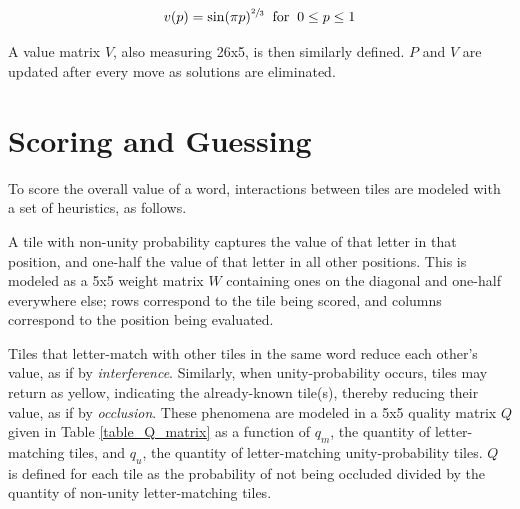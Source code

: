\documentclass[twocolumn]{tudelft-aiaa}
\begin{document}
\begin{equation}
\label{equation_p_vs_v}
v(p) = \sin (\pi p) ^ {\sfrac{2}{3}} \hspace{2mm} \text{for} \hspace{2mm} 0 \leq p \leq 1
\end{equation}

A value matrix $V$, also measuring 26x5, is then similarly defined. $P$ and $V$ are updated after every move as solutions are eliminated.

\section{Scoring and Guessing}

To score the overall value of a word, interactions between tiles are modeled with a set of heuristics, as follows.

A tile with non-unity probability captures the value of that letter in that position, and one-half the value of that letter in all other positions. This is modeled as a 5x5 weight matrix $W$ containing ones on the diagonal and one-half everywhere else; rows correspond to the tile being scored, and columns correspond to the position being evaluated.

Tiles that letter-match with other tiles in the same word reduce each other's value, as if by \emph{interference}. Similarly, when unity-probability occurs, tiles may return as yellow, indicating the already-known tile(s), thereby reducing their value, as if by \emph{occlusion}. These phenomena are modeled in a 5x5 quality matrix $Q$ given in Table \ref{table_Q_matrix} as a function of $q_m$, the quantity of letter-matching tiles, and $q_u$, the quantity of letter-matching unity-probability tiles. $Q$ is defined for each tile as the probability of not being occluded divided by the quantity of non-unity letter-matching tiles.
\end{document}
